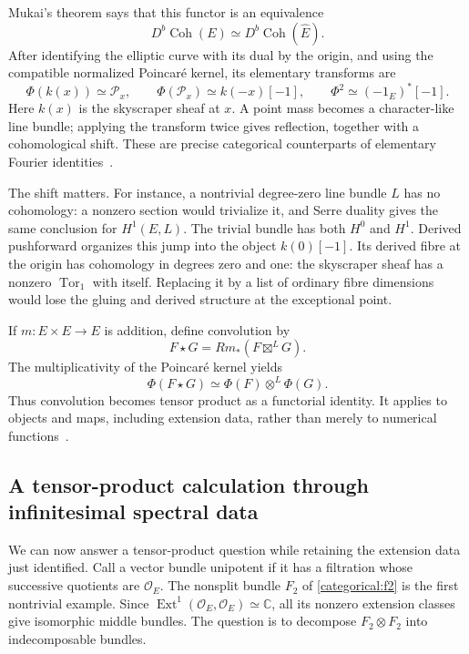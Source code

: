 \documentclass[11pt]{article}
\theoremstyle{remark}
\begin{document}
Mukai's theorem says that this functor is an equivalence
\[
D^b\operatorname{Coh}(E)
\simeq D^b\operatorname{Coh}(\widehat E).
\]
After identifying the elliptic curve with its dual by the origin, and using the compatible normalized Poincar\'e kernel, its elementary transforms are
\begin{equation}
\Phi(k(x))\simeq\mathcal P_x,
\qquad
\Phi(\mathcal P_x)\simeq k(-x)[-1],
\qquad
\Phi^2\simeq(-1_E)^*[-1].
\label{categorical:inversion}
\end{equation}
Here \(k(x)\) is the skyscraper sheaf at \(x\). A point mass becomes a character-like line bundle; applying the transform twice gives reflection, together with a cohomological shift. These are precise categorical counterparts of elementary Fourier identities~\cite{chen}.

The shift matters. For instance, a nontrivial degree-zero line bundle \(L\) has no cohomology: a nonzero section would trivialize it, and Serre duality gives the same conclusion for \(H^1(E,L)\). The trivial bundle has both \(H^0\) and \(H^1\). Derived pushforward organizes this jump into the object \(k(0)[-1]\). Its derived fibre at the origin has cohomology in degrees zero and one: the skyscraper sheaf has a nonzero \(\operatorname{Tor}_1\) with itself. Replacing it by a list of ordinary fibre dimensions would lose the gluing and derived structure at the exceptional point.

If \(m:E\times E\to E\) is addition, define convolution by
\[
F\star G=Rm_*(F\boxtimes^{L}G).
\]
The multiplicativity of the Poincar\'e kernel yields
\begin{equation}
\Phi(F\star G)\simeq
\Phi(F)\otimes^{L}\Phi(G).
\label{categorical:convolution}
\end{equation}
Thus convolution becomes tensor product as a functorial identity. It applies to objects and maps, including extension data, rather than merely to numerical functions~\cite{chen}.

\subsection{A tensor-product calculation through infinitesimal spectral data}

We can now answer a tensor-product question while retaining the extension data just identified. Call a vector bundle unipotent if it has a filtration whose successive quotients are \(\mathcal O_E\). The nonsplit bundle \(F_2\) of \eqref{categorical:f2} is the first nontrivial example.
Since \(\operatorname{Ext}^1(\mathcal O_E,\mathcal O_E)\simeq\mathbb C\), all its nonzero extension classes give isomorphic middle bundles. The question is to decompose \(F_2\otimes F_2\) into indecomposable bundles.
\end{document}
